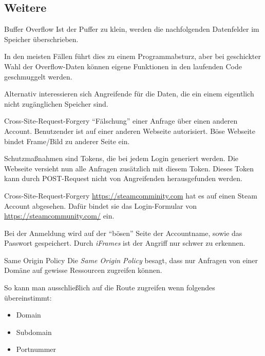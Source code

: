 \subsection{Weitere}

\begin{defi}{Buffer Overflow}
    Ist der Puffer zu klein, werden die nachfolgenden Datenfelder im Speicher überschrieben.

    In den meisten Fällen führt dies zu einem Programmabsturz, aber bei geschickter Wahl der Overflow-Daten können eigene Funktionen in den laufenden Code geschmuggelt werden.

    Alternativ interessieren sich Angreifende für die Daten, die ein einem eigentlich nicht zugänglichen Speicher sind.
\end{defi}

\begin{defi}{Cross-Site-Request-Forgery}
    \enquote{Fälschung} einer Anfrage über einen anderen Account.
    Benutzender ist auf einer anderen Webseite autorisiert.
    Böse Webseite bindet Frame/Bild zu anderer Seite ein.

    Schutzmaßnahmen sind Tokens, die bei jedem Login generiert werden.
    Die Webseite versieht nun alle Anfragen zusätzlich mit diesem Token.
    Dieses Token kann durch POST-Request nicht von Angreifenden herausgefunden werden.
\end{defi}

\begin{example}{Cross-Site-Request-Forgery}
    \href{https://www.youtube.com/watch?v=dQw4w9WgXcQ}{https://steamcomminity.com} hat es auf einen Steam Account abgesehen.
    Dafür bindet sie das Login-Formular von \href{https://steamcommunity.com/}{https://steamcommunity.com/} ein.

    Bei der Anmeldung wird auf der \enquote{bösen} Seite der Accountname, sowie das Passwort gespeichert.
    Durch \emph{iFrames} ist der Angriff nur schwer zu erkennen.
\end{example}

\begin{defi}{Same Origin Policy}
    Die \emph{Same Origin Policy} besagt, dass nur Anfragen von einer Domäne auf gewisse Ressourcen zugreifen können.

    So kann man ausschließlich auf die Route zugreifen wenn folgendes übereinstimmt:
    \begin{itemize}
        \item Domain
        \item Subdomain
        \item Portnummer
    \end{itemize}
\end{defi}

